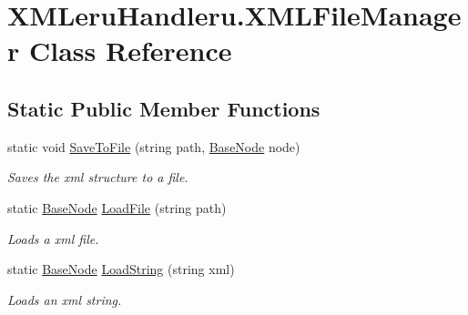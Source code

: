 \hypertarget{class_x_m_leru_handleru_1_1_x_m_l_file_manager}{}\section{X\+M\+Leru\+Handleru.\+X\+M\+L\+File\+Manager Class Reference}
\label{class_x_m_leru_handleru_1_1_x_m_l_file_manager}
\subsection*{Static Public Member Functions}
\begin{DoxyCompactItemize}
\item 
static void \hyperlink{class_x_m_leru_handleru_1_1_x_m_l_file_manager_af518835562c9dc0e93f2f737923a0935}{Save\+To\+File} (string path, \hyperlink{class_x_m_leru_handleru_1_1_base_node}{Base\+Node} node)
\begin{DoxyCompactList}\small\item\em Saves the xml structure to a file. \end{DoxyCompactList}\item 
static \hyperlink{class_x_m_leru_handleru_1_1_base_node}{Base\+Node} \hyperlink{class_x_m_leru_handleru_1_1_x_m_l_file_manager_a2e3dfed69563014bb11b61699ce76799}{Load\+File} (string path)
\begin{DoxyCompactList}\small\item\em Loads a xml file. \end{DoxyCompactList}\item 
static \hyperlink{class_x_m_leru_handleru_1_1_base_node}{Base\+Node} \hyperlink{class_x_m_leru_handleru_1_1_x_m_l_file_manager_af04699e6a4e0195b2e408e52aab1eaee}{Load\+String} (string xml)
\begin{DoxyCompactList}\small\item\em Loads an xml string. \end{DoxyCompactList}\end{DoxyCompactItemize}
